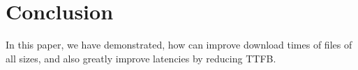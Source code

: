 \section{Conclusion}
In this paper, we have demonstrated, how \oursys can improve download times of files of all sizes, and also greatly improve latencies by reducing TTFB.